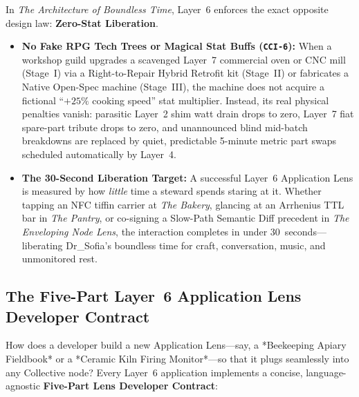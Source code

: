 In \textit{The Architecture of Boundless Time}, Layer~6 enforces the exact opposite design law:
\textbf{Zero-Stat Liberation}.
\begin{itemize}
    \item \textbf{No Fake RPG Tech Trees or Magical Stat Buffs (\texttt{CCI-6}):} When a workshop
          guild upgrades a scavenged Layer~7 commercial oven or CNC mill (Stage~I) via a
          Right-to-Repair Hybrid Retrofit kit (Stage~II) or fabricates a Native Open-Spec machine
          (Stage~III), the machine does not acquire a fictional ``$+25\%$ cooking speed'' stat
          multiplier. Instead, its real physical penalties vanish: parasitic Layer~2 shim watt
          drain drops to zero, Layer~7 fiat spare-part tribute drops to zero, and unannounced blind
          mid-batch breakdowns are replaced by quiet, predictable 5-minute metric part swaps
          scheduled automatically by Layer~4.
    \item \textbf{The 30-Second Liberation Target:} A successful Layer~6 Application Lens is
          measured by how \emph{little} time a steward spends staring at it. Whether tapping an NFC
          tiffin carrier at \textit{The Bakery}, glancing at an Arrhenius TTL bar in \textit{The
          Pantry}, or co-signing a Slow-Path Semantic Diff precedent in \textit{The Enveloping Node
          Lens}, the interaction completes in under $30$~seconds---liberating Dr\_Sofia's boundless
          time for craft, conversation, music, and unmonitored rest.
\end{itemize}

\subsection{The Five-Part Layer~6 Application Lens Developer Contract}
\label{subsec:ch1-developer-contract}

How does a developer build a new Application Lens---say, a *Beekeeping Apiary Fieldbook* or a
*Ceramic Kiln Firing Monitor*---so that it plugs seamlessly into any Collective node? Every
Layer~6 application implements a concise, language-agnostic \textbf{Five-Part Lens Developer Contract}:

